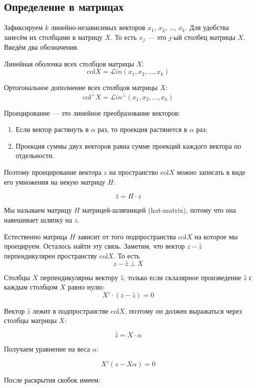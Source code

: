 \documentclass[11pt,russian,]{article}
\newcommand{\1}{\mathbbm{1}}
\newcommand{\Lin}{\mathcal{L}in}
\newcommand{\Linp}{\Lin^{\perp}}
\newcommand{\col}{\mathcal{col}}
\newcommand{\colp}{\col^{\perp}}
\renewcommand{\col}{\mathrm{col}}
\begin{document}
\subsection{Определение в матрицах}\label{--}

Зафиксируем \(k\) линейно-независимых векторов \(x_1\), \(x_2\), \ldots,
\(x_k\). Для удобства занесём их столбцами в матрицу \(X\). То есть
\(x_j\) --- это \(j\)-ый столбец матрицы \(X\). Введём два обозначения.

Линейная оболочка всех столбцов матрицы \(X\): \[
\col X = \Lin(x_1, x_2, \ldots, x_k)
\]

Ортогональное дополнение всех столбцов матрицы \(X\): \[
\colp X = \Linp(x_1, x_2, \ldots, x_k)
\]

Проецирование --- это линейное преобразование векторов:

\begin{enumerate}
\def\labelenumi{\arabic{enumi}.}
\item
  Если вектор растянуть в \(\alpha\) раз, то проекция растянется в
  \(\alpha\) раз;
\item
  Проекция суммы двух векторов равна сумме проекций каждого вектора по
  отдельности.
\end{enumerate}

Поэтому проецирование вектора \(z\) на пространство \(\col X\) можно
записать в виде его умножения на некую матрицу \(H\):

\[
\hat z = H \cdot z
\]

Мы называем матрицу \(H\) матрицей-шляпницей (hat-matrix), потому что
она навешивает шляпку на \(z\).

Естественно матрица \(H\) зависит от того подпространства \(\col X\) на
которое мы проецируем. Осталось найти эту связь. Заметим, что вектор
\(z - \hat z\) перпендикулярен пространству \(\col X\). То есть \[
z - \hat z \perp X
\]

Столбцы \(X\) перпендикулярны вектору \(\hat z\), только если склалярное
произведение \(\hat z\) с каждым столбцом \(X\) равно нулю: \[
X' \cdot (z - \hat z) = 0
\]

Вектор \(\hat z\) лежит в подпространстве \(\col X\), поэтому он должен
выражаться через столбцы матрицы \(X\):

\[
\hat z = X\cdot \alpha
\]

Получаем уравнение на веса \(\alpha\):

\[
X' (z - X\alpha)=0
\]

После раскрытия скобок имеем:
\end{document}
